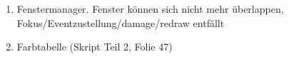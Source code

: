 
\begin{enumerate}
\item Fenstermanager. Fenster können sich nicht mehr überlappen,
Fokus/Eventzustellung/damage/redraw entfällt 

\item Farbtabelle (Skript Teil 2, Folie 47)

\end{enumerate}